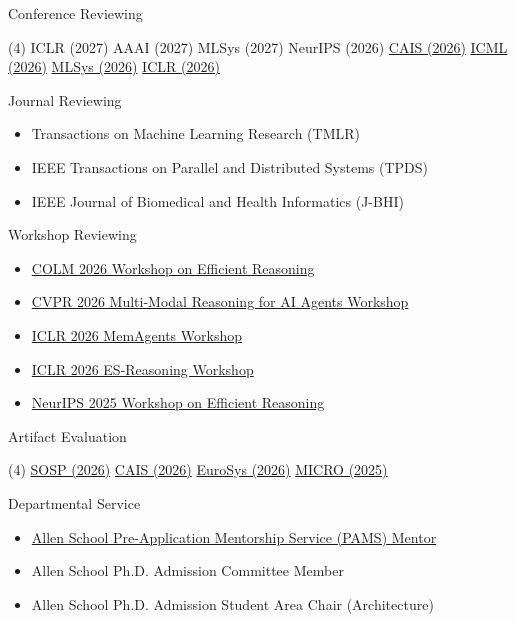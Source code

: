 \documentclass[10pt]{extarticle}
\begin{document}
\noindent Conference Reviewing
\begin{tasks}(4)
    \task ICLR (2027)
    \task AAAI (2027)
    \task MLSys (2027)
    \task NeurIPS (2026)
    \task \href{https://www.caisconf.org/program/2026/committee/}{CAIS (2026)}
    \task \href{https://icml.cc/Conferences/2026/ProgramCommittee}{ICML (2026)}
    \task \href{https://mlsys26.hotcrp.com/users/pc}{MLSys (2026)}
    \task \href{https://iclr.cc/Conferences/2026/ProgramCommittee}{ICLR (2026)}
\end{tasks}
\noindent Journal Reviewing
\begin{itemize}
    \item Transactions on Machine Learning Research (TMLR)
    \item IEEE Transactions on Parallel and Distributed Systems (TPDS)
    \item IEEE Journal of Biomedical and Health Informatics (J-BHI)
\end{itemize}
\noindent Workshop Reviewing
\begin{itemize}
    \item \href{https://wdlctc.github.io/efficient-reasoning-2026/}{COLM 2026 Workshop on Efficient Reasoning}
    \item \href{https://mmragi.github.io/mmragi/}{CVPR 2026 Multi-Modal Reasoning for AI Agents Workshop}
    \item \href{https://sites.google.com/view/memagent-iclr26/}{ICLR 2026 MemAgents Workshop}
    \item \href{https://sites.google.com/ucsd.edu/efficient-spatial-reasoning/}{ICLR 2026 ES-Reasoning Workshop}
    \item \href{https://efficient-reasoning.github.io/}{NeurIPS 2025 Workshop on Efficient Reasoning}
\end{itemize}
\noindent Artifact Evaluation
\begin{tasks}(4)
    \task \href{https://sosp26ae.hotcrp.com/users/pc}{SOSP (2026)}
    \task \href{https://cais26-ae.hotcrp.com/users/pc}{CAIS (2026)}
    \task \href{https://sysartifacts.github.io/eurosys2026/organizers}{EuroSys (2026)}
    \task \href{https://www.microarch.org/micro58/submit/artifacts.php}{MICRO (2025)}
\end{tasks}
\noindent Departmental Service
\begin{itemize}
    \item \href{https://www.cs.washington.edu/academics/graduate/phd-program/phd-admissions/pams/}{Allen School Pre-Application Mentorship Service (PAMS) Mentor} 
    \item Allen School Ph.D. Admission Committee Member 
    \item Allen School Ph.D. Admission Student Area Chair (Architecture) 
\end{itemize}
\end{document}
